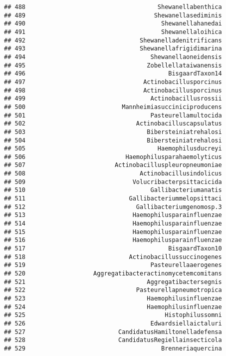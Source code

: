 \documentclass[
]{article}
\begin{document}
\begin{verbatim}
## 488                                     Shewanellabenthica
## 489                                    Shewanellasediminis
## 490                                      Shewanellahanedai
## 491                                      Shewanellaloihica
## 492                                Shewanelladenitrificans
## 493                                Shewanellafrigidimarina
## 494                                   Shewanellaoneidensis
## 495                                  Zobellellataiwanensis
## 496                                        BisgaardTaxon14
## 497                                 Actinobacillusporcinus
## 498                                 Actinobacillusporcinus
## 499                                   Actinobacillusrossii
## 500                           Mannheimiasucciniciproducens
## 501                                   Pasteurellamultocida
## 502                               Actinobacilluscapsulatus
## 503                                  Bibersteiniatrehalosi
## 504                                  Bibersteiniatrehalosi
## 505                                     Haemophilusducreyi
## 506                            Haemophilusparahaemolyticus
## 507                         Actinobacilluspleuropneumoniae
## 508                                Actinobacillusindolicus
## 509                              Volucribacterpsittacicida
## 510                                   Gallibacteriumanatis
## 511                             Gallibacteriummelopsittaci
## 512                               Gallibacteriumgenomosp.3
## 513                              Haemophilusparainfluenzae
## 514                              Haemophilusparainfluenzae
## 515                              Haemophilusparainfluenzae
## 516                              Haemophilusparainfluenzae
## 517                                        BisgaardTaxon10
## 518                             Actinobacillussuccinogenes
## 519                                   Pasteurellaaerogenes
## 520                   Aggregatibacteractinomycetemcomitans
## 521                                  Aggregatibactersegnis
## 522                               Pasteurellapneumotropica
## 523                                  Haemophilusinfluenzae
## 524                                  Haemophilusinfluenzae
## 525                                       Histophilussomni
## 526                                   Edwardsiellaictaluri
## 527                          CandidatusHamiltonelladefensa
## 528                          CandidatusRegiellainsecticola
## 529                                      Brenneriaquercina

\end{verbatim}
\end{document}
